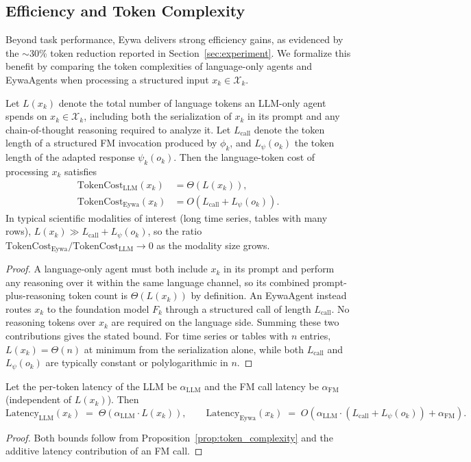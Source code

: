 \subsection{Efficiency and Token Complexity}
\label{app:efficiency}

Beyond task performance, Eywa delivers strong efficiency gains, as evidenced by the $\sim$30\% token reduction reported in Section~\ref{sec:experiment}. We formalize this benefit by comparing the token complexities of language-only agents and EywaAgents when processing a structured input $x_k\in\mathcal{X}_k$.

\begin{proposition}
\label{prop:token_complexity}
Let $L(x_k)$ denote the total number of language tokens an LLM-only agent spends on $x_k\in\mathcal{X}_k$, including both the serialization of $x_k$ in its prompt and any chain-of-thought reasoning required to analyze it. Let $L_{\mathrm{call}}$ denote the token length of a structured FM invocation produced by $\phi_k$, and $L_{\psi}(o_k)$ the token length of the adapted response $\psi_k(o_k)$. Then the language-token cost of processing $x_k$ satisfies
\begin{align}
\mathrm{TokenCost}_{\mathrm{LLM}}(x_k) &= \Theta(L(x_k)), \\
\mathrm{TokenCost}_{\mathrm{Eywa}}(x_k) &= O(L_{\mathrm{call}}+L_{\psi}(o_k)).
\end{align}
In typical scientific modalities of interest (long time series, tables with many rows), $L(x_k)\gg L_{\mathrm{call}}+L_{\psi}(o_k)$, so the ratio $\mathrm{TokenCost}_{\mathrm{Eywa}}/\mathrm{TokenCost}_{\mathrm{LLM}}\to 0$ as the modality size grows.
\end{proposition}
\begin{proof}
A language-only agent must both include $x_k$ in its prompt and perform any reasoning over it within the same language channel, so its combined prompt-plus-reasoning token count is $\Theta(L(x_k))$ by definition. An EywaAgent instead routes $x_k$ to the foundation model $F_k$ through a structured call of length $L_{\mathrm{call}}$. No reasoning tokens over $x_k$ are required on the language side. Summing these two contributions gives the stated bound. For time series or tables with $n$ entries, $L(x_k)=\Theta(n)$ at minimum from the serialization alone, while both $L_{\mathrm{call}}$ and $L_{\psi}(o_k)$ are typically constant or polylogarithmic in $n$.
\end{proof}

\begin{proposition}
\label{prop:latency}
Let the per-token latency of the LLM be $\alpha_{\mathrm{LLM}}$ and the FM call latency be $\alpha_{\mathrm{FM}}$ (independent of $L(x_k)$). Then
\[
\mathrm{Latency}_{\mathrm{LLM}}(x_k)\;=\;\Theta(\alpha_{\mathrm{LLM}}\cdot L(x_k)),
\qquad
\mathrm{Latency}_{\mathrm{Eywa}}(x_k)\;=\;O(\alpha_{\mathrm{LLM}}\cdot(L_{\mathrm{call}}+L_{\psi}(o_k))+\alpha_{\mathrm{FM}}).
\]
\end{proposition}
\begin{proof}
Both bounds follow from Proposition~\ref{prop:token_complexity} and the additive latency contribution of an FM call.
\end{proof}

